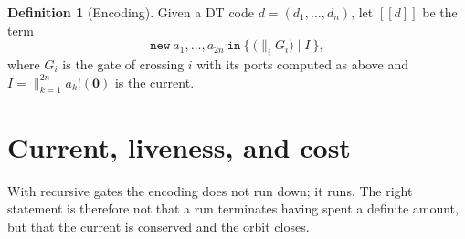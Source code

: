 \documentclass[11pt]{article}
\theoremstyle{definition}
\newtheorem{definition}{Definition}
\newcommand{\enc}[1]{[\![ #1 ]\!]}
\newcommand{\Nil}{\mathbf{0}}
\begin{document}
\begin{definition}[Encoding]\label{def:enc}
Given a DT code $d=(d_1,\dots,d_n)$, let $\enc{d}$ be the term
\[
\mathtt{new}\ a_1,\dots,a_{2n}\ \mathtt{in}\ \{\ \big(\textstyle\parallel_{i} G_i\big)\mid I\ \},
\]
where $G_i$ is the gate of crossing $i$ with its ports computed as above and $I =
\parallel_{k=1}^{2n} a_k!(\Nil)$ is the current.
\end{definition}

\section{Current, liveness, and cost}\label{sec:current}

With recursive gates the encoding does not run down; it runs. The right
statement is therefore not that a run terminates having spent a definite amount,
but that the current is conserved and the orbit closes.
\end{document}
